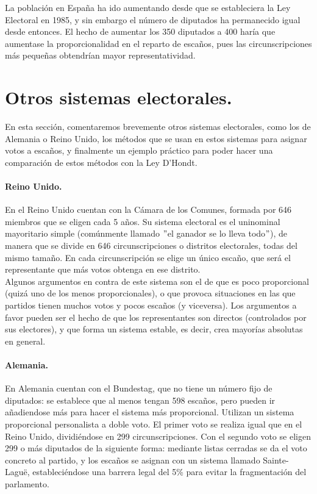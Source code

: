 \documentclass[11pt]{article}
\begin{document}
		La población en España ha ido aumentando desde que se estableciera la Ley Electoral en 1985, y sin embargo el número de diputados ha permanecido igual desde entonces. El hecho de aumentar los 350 diputados a 400 haría que aumentase la proporcionalidad en el reparto de escaños, pues las circunscripciones más pequeñas obtendrían mayor representatividad.
	
	\newpage
	

	
	\section{Otros sistemas electorales.}
	
	En esta sección, comentaremos brevemente otros sistemas electorales, como los de Alemania o Reino Unido, los métodos que se usan en estos sistemas para asignar votos a escaños, y finalmente un ejemplo práctico para poder hacer una comparación de estos métodos con la Ley D'Hondt.
	
\paragraph{Reino Unido.}

En el Reino Unido cuentan con la Cámara de los Comunes, formada por 646 miembros que se eligen cada 5 años. Su sistema electoral es el uninominal mayoritario simple (comúnmente llamado $"$el ganador se lo lleva todo$"$), de manera que se divide en 646 circunscripciones o distritos electorales, todas del mismo tamaño. En cada circunscripción se elige un único escaño, que será el representante que más votos obtenga en ese distrito.\\

Algunos argumentos en contra de este sistema son el de que es poco proporcional (quizá uno de los menos proporcionales), o que provoca situaciones en las que partidos tienen muchos votos y pocos escaños (y viceversa). Los argumentos a favor pueden ser el hecho de que los representantes son directos (controlados por sus electores), y que forma un sistema estable, es decir, crea mayorías absolutas en general.

\paragraph{Alemania.}

En Alemania cuentan con el Bundestag, que no tiene un número fijo de diputados: se establece que al menos tengan 598 escaños, pero pueden ir añadiendose más para hacer el sistema más proporcional. Utilizan un sistema proporcional personalista a doble voto. El primer voto se realiza igual que en el Reino Unido, dividiéndose en 299 circunscripciones. Con el segundo voto se eligen 299 o más diputados de la siguiente forma: mediante listas cerradas se da el voto concreto al partido, y los escaños se asignan con un sistema llamado Sainte-Laguë, estableciéndose una barrera legal del 5\% para evitar la fragmentación del parlamento.
\end{document}
